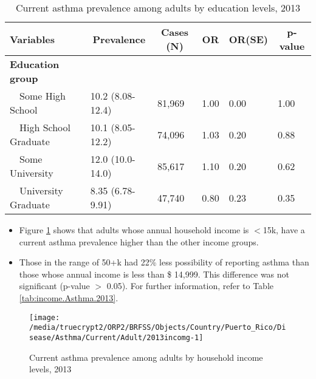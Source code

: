 \begin{table}[H]
\caption{Current asthma prevalence  among adults by education levels, 2013\label{tab:edu.Asthma.2013}} 
\begin{center}
\begin{tabular}{llllll}
\hline\hline
\multicolumn{1}{l}{Variables}&\multicolumn{1}{c}{Prevalence}&\multicolumn{1}{c}{Cases (N)}&\multicolumn{1}{c}{OR}&\multicolumn{1}{c}{OR(SE)}&\multicolumn{1}{c}{p-value}\tabularnewline
\hline
{\bfseries Education group}&&&&&\tabularnewline
~~Some High School&10.2 (8.08-12.4)&81,969&1.00&0.00&1.00\tabularnewline
~~High School Graduate&10.1 (8.05-12.2)&74,096&1.03&0.20&0.88\tabularnewline
~~Some University&12.0 (10.0-14.0)&85,617&1.10&0.20&0.62\tabularnewline
~~University Graduate&8.35 (6.78-9.91)&47,740&0.80&0.23&0.35\tabularnewline
\hline
\end{tabular}\end{center}

\end{table}

 
 
 \newpage
\begin{itemize}

\item Figure \ref{fig:income.Asthma.2013} shows that adults whose annual household income is 
$<$15k, have a current asthma prevalence higher than the other income groups.

\item Those in the range of 50+k had 22\% less possibility of reporting asthma than those whose annual income is less than \$ 14,999. This difference was not significant (p-value $>$ 0.05).  For further information, refer to Table \ref{tab:income.Asthma.2013}.

\end{itemize}

\begin{figure}[H]
\caption{Current asthma prevalence among adults by household income levels, 
         2013}
\begin{knitrout}
\color{fgcolor}

{\centering \texttt{[image: /media/truecrypt2/ORP2/BRFSS/Objects/Country/Puerto\_Rico/Disease/Asthma/Current/Adult/2013incomg-1]} 

}



\end{knitrout}
 \label{fig:income.Asthma.2013}
\end{figure}

